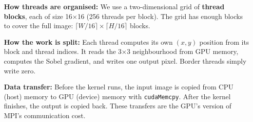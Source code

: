\documentclass[12pt,a4paper]{article}
\begin{document}
\textbf{How threads are organised:} We use a two-dimensional grid of
\textbf{thread blocks}, each of size 16$\times$16 (256 threads per block).
The grid has enough blocks to cover the full image:
$\lceil W/16 \rceil \times \lceil H/16 \rceil$ blocks.

\textbf{How the work is split:} Each thread computes its own $(x,y)$ position
from its block and thread indices. It reads the 3$\times$3 neighbourhood from
GPU memory, computes the Sobel gradient, and writes one output pixel. Border
threads simply write zero.

\textbf{Data transfer:} Before the kernel runs, the input image is copied from
CPU (host) memory to GPU (device) memory with \texttt{cudaMemcpy}. After the
kernel finishes, the output is copied back. These transfers are the GPU's
version of MPI's communication cost.
\end{document}
